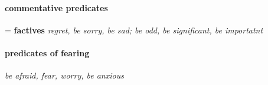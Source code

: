\documentclass[a4,12pt]{scrartcl}
\begin{document}
\begin{exe}
\ex 

\ex %

\ex %


\ex %


\ex %

\end{exe}

\paragraph {\bf commentative predicates} = {\bf factives} {\it regret, be sorry, be sad; be odd, be significant, be importatnt} \cite[3.2.4]{noonan2007}


\begin{exe}
\ex %


\ex %


\ex %



\ex %


\ex %



\ex %


\end{exe}

\paragraph {\bf predicates of fearing} \cite[3.2.6]{noonan2007} {\it be afraid, fear, worry, be anxious} 
\end{document}

